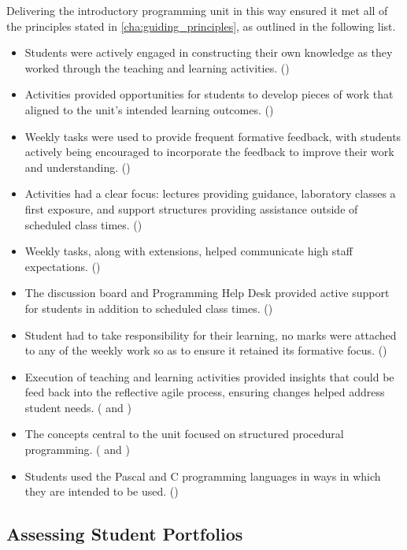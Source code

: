 Delivering the introductory programming unit in this way ensured it met all of the principles stated in \cref{cha:guiding_principles}, as outlined in the following list. 
\begin{itemize}[noitemsep,nolistsep]
	\item Students were actively engaged in constructing their own knowledge as they worked through the teaching and learning activities. ()
	\item Activities provided opportunities for students to develop pieces of work that aligned to the unit's intended learning outcomes. ()
	\item Weekly tasks were used to provide frequent formative feedback, with students actively being encouraged to incorporate the feedback to improve their work and understanding. ()
	\item Activities had a clear focus: lectures providing guidance, laboratory classes a first exposure, and support structures providing assistance outside of scheduled class times. ()
	\item Weekly tasks, along with extensions, helped communicate high staff expectations. ()
	\item The discussion board and Programming Help Desk provided active support for students in addition to scheduled class times. ()
	\item Student had to take responsibility for their learning, no marks were attached to any of the weekly work so as to ensure it retained its formative focus. ()
	\item Execution of teaching and learning activities provided insights that could be feed back into the reflective agile process, ensuring changes helped address student needs.  ( and )
	\item The concepts central to the unit focused on structured procedural programming. ( and )
	\item Students used the Pascal and C programming languages in ways in which they are intended to be used. ()
\end{itemize}



\subsection{Assessing Student Portfolios} %
\label{sub:assessing_student_portfolios}

